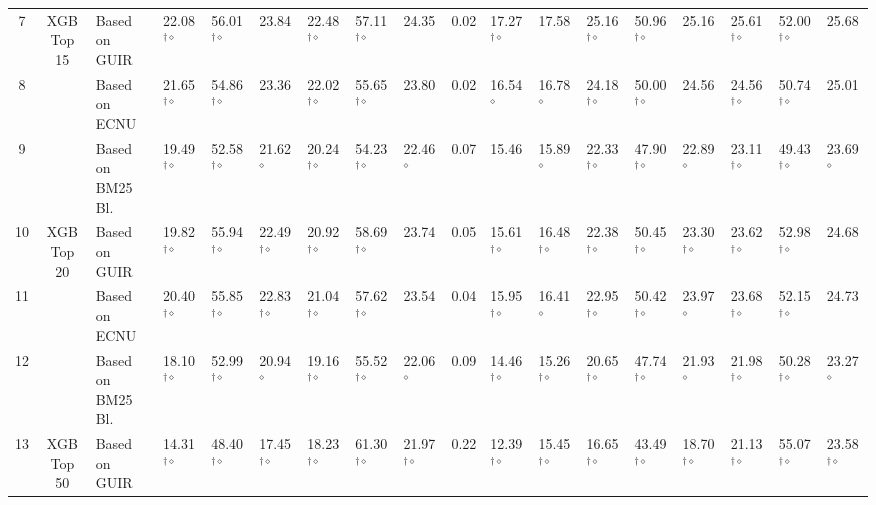 \begin{table*}
{\begin{tabular}{ccllllllllllllllll}
\midrule
\midrule 
7 & \multirow{3}{*}{XGB Top 15} & Based on GUIR  & 22.08$^{\dagger\diamond}$ & 56.01$^{\dagger\diamond}$ & 23.84  & 22.48$^{\dagger\diamond}$ & 57.11$^{\dagger\diamond}$ & 24.35 & 0.02 & 17.27$^{\dagger\diamond}$ & 17.58 & 25.16$^{\dagger\diamond}$ & 50.96$^{\dagger\diamond}$ & 25.16 & 25.61$^{\dagger\diamond}$ & 52.00$^{\dagger\diamond}$ & 25.68\tabularnewline
8  &  & Based on ECNU  & 21.65$^{\dagger\diamond}$ & 54.86$^{\dagger\diamond}$ & 23.36  & 22.02$^{\dagger\diamond}$ & 55.65$^{\dagger\diamond}$ & 23.80 & 0.02 & 16.54 $^{\diamond}$  & 16.78$^{\diamond}$  & 24.18$^{\dagger\diamond}$ & 50.00$^{\dagger\diamond}$ & 24.56 & 24.56$^{\dagger\diamond}$ & 50.74$^{\dagger\diamond}$ & 25.01\tabularnewline
9  &  & Based on BM25 Bl.  & 19.49$^{\dagger\diamond}$ & 52.58$^{\dagger\diamond}$ & 21.62$^{\diamond}$  & 20.24$^{\dagger\diamond}$ & 54.23$^{\dagger\diamond}$ & 22.46$^{\diamond}$ & 0.07 & 15.46  & 15.89$^{\diamond}$  & 22.33$^{\dagger\diamond}$ & 47.90$^{\dagger\diamond}$ & 22.89$^{\diamond}$ & 23.11$^{\dagger\diamond}$ & 49.43$^{\dagger\diamond}$ & 23.69$^{\diamond}$\tabularnewline
\midrule 
10 & \multirow{3}{*}{XGB Top 20} & Based on GUIR  & 19.82$^{\dagger\diamond}$ & 55.94$^{\dagger\diamond}$ & 22.49$^{\dagger\diamond}$ & 20.92$^{\dagger\diamond}$ & 58.69$^{\dagger\diamond}$ & 23.74 & 0.05 & 15.61$^{\dagger\diamond}$ & 16.48$^{\dagger\diamond}$ & 22.38$^{\dagger\diamond}$ & 50.45$^{\dagger\diamond}$ & 23.30$^{\dagger\diamond}$ & 23.62$^{\dagger\diamond}$ & 52.98$^{\dagger\diamond}$ & 24.68\tabularnewline
11 &  & Based on ECNU  & 20.40$^{\dagger\diamond}$ & 55.85$^{\dagger\diamond}$ & 22.83$^{\dagger\diamond}$ & 21.04$^{\dagger\diamond}$ & 57.62$^{\dagger\diamond}$ & 23.54 & 0.04 & 15.95$^{\dagger\diamond}$ & 16.41$^{\diamond}$  & 22.95$^{\dagger\diamond}$ & 50.42$^{\dagger\diamond}$ & 23.97$^{\diamond}$ & 23.68$^{\dagger\diamond}$ & 52.15$^{\dagger\diamond}$ & 24.73\tabularnewline
12  &  & Based on BM25 Bl.  & 18.10$^{\dagger\diamond}$ & 52.99$^{\dagger\diamond}$ & 20.94$^{\diamond}$ & 19.16$^{\dagger\diamond}$ & 55.52$^{\dagger\diamond}$ & 22.06$^{\diamond}$ & 0.09 & 14.46$^{\dagger\diamond}$ & 15.26$^{\dagger\diamond}$ & 20.65$^{\dagger\diamond}$ & 47.74$^{\dagger\diamond}$ & 21.93$^{\diamond}$ & 21.98$^{\dagger\diamond}$ & 50.28$^{\dagger\diamond}$ & 23.27$^{\diamond}$\tabularnewline
\midrule 
13 & \multirow{3}{*}{XGB Top 50} & Based on GUIR  & 14.31$^{\dagger\diamond}$ & 48.40$^{\dagger\diamond}$ & 17.45$^{\dagger\diamond}$ & 18.23$^{\dagger\diamond}$ & 61.30$^{\dagger\diamond}$ & 21.97$^{\dagger\diamond}$ & 0.22 & 12.39$^{\dagger\diamond}$ & 15.45$^{\dagger\diamond}$ & 16.65$^{\dagger\diamond}$ & 43.49$^{\dagger\diamond}$ & 18.70$^{\dagger\diamond}$ & 21.13$^{\dagger\diamond}$ & 55.07$^{\dagger\diamond}$ & 23.58$^{\dagger\diamond}$\tabularnewline

\end{tabular}}
\end{table*}
